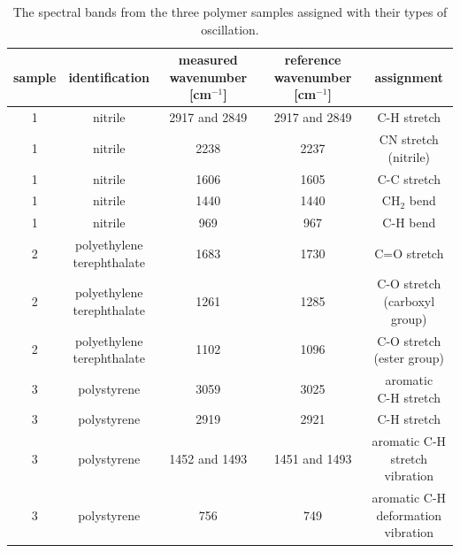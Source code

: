 \documentclass[a4paper,abstracton]{article}	                       %
\renewcommand{\cite}{\supercite}						%
\begin{document}
\begin{table}[H]
\centering
\begin{tabular}{c|c|c|c|c}
sample  & identification & \thead{measured \\ wavenumber [cm$^{-1}$]} & \thead{reference \\ wavenumber [cm$^{-1}$]} & assignment\cite{assignment}\\

     \hline
    1 & nitrile & 2917 and 2849 & 2917 and 2849\cite{nitrile}  & C-H stretch \\
    1 & nitrile & 2238 & 2237 \cite{nitrile} & \thead{CN stretch \\ (nitrile)}\\
    1 & nitrile & 1606 & 1605 \cite{nitrile}  & C-C stretch\\
    1 & nitrile & 1440 & 1440 \cite{nitrile} & CH$_{2}$ bend\\
    1 & nitrile & 969 & 967 \cite{nitrile}  & C-H bend\\
    2 & \thead{polyethylene \\ terephthalate} & 1683 & 1730\cite{pet} & C=O stretch \\
    2 & \thead{polyethylene \\ terephthalate} & 1261 & 1285\cite{pet} & \thead{C-O stretch \\ (carboxyl group)}\\
    2 & \thead{polyethylene \\ terephthalate} & 1102 & 1096\cite{pet} &\thead{C-O stretch \\ (ester group)}\\
    3 & polystyrene & 3059 & 3025\cite{poly} & \thead{aromatic \\ C-H stretch}\\
    3 & polystyrene & 2919 & 2921\cite{poly} & C-H stretch\\
    3 & polystyrene & 1452 and 1493 & 1451 and 1493\cite{poly} & \thead{aromatic C-H \\ stretch vibration}\\
    3 & polystyrene & 756 & 749\cite{poly} & \thead{aromatic C-H \\ deformation vibration}
\end{tabular}
\caption{\label{tab:TeilD} The spectral bands from the three polymer samples assigned with their types of oscillation.}
\end{table}
\end{document}

